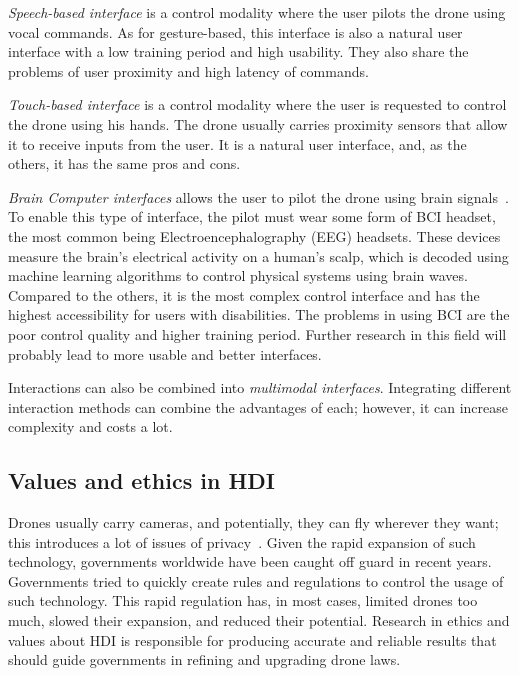 \textit{Speech-based interface} is a control modality where the user pilots the drone using vocal commands. 
As for gesture-based, this interface is also a natural user interface with a low training period and high usability.
They also share the problems of user proximity and high latency of commands.  

\textit{Touch-based interface} is a control modality where the user is requested to control the drone using his hands. 
The drone usually carries proximity sensors that allow it to receive inputs from the user. 
It is a natural user interface, and, as the others, it has the same pros and cons.

\textit{Brain Computer interfaces} allows the user to pilot the drone using brain signals~\cite{lafleur2013quadcopterBCI}.
To enable this type of interface, the pilot must wear some form of BCI headset, the most common being 
Electroencephalography (EEG) headsets. These devices measure the brain's electrical activity on a human's scalp, 
which is decoded using machine learning algorithms to control physical systems using brain waves. 
Compared to the others, it is the most complex control interface and has the highest accessibility for users with disabilities. 
The problems in using BCI are the poor control quality and higher training period. 
Further research in this field will probably lead to more usable and better interfaces.

Interactions can also be combined into \textit{multimodal interfaces}. 
Integrating different interaction methods can combine the advantages of each; however, it can increase complexity and costs a lot.

\subsection{Values and ethics in HDI}\label{subsec:hdi_ethics}
Drones usually carry cameras, and potentially, they can fly wherever they want; this introduces a lot of issues of privacy~\cite{anderson2012accidentally}.
Given the rapid expansion of such technology, governments worldwide have been caught off guard in recent years. 
Governments tried to quickly create rules and regulations to control the usage of such technology. 
This rapid regulation has, in most cases, limited drones too much, slowed their expansion, and reduced their potential.
Research in ethics and values about HDI is responsible for producing accurate and reliable results that should guide 
governments in refining and upgrading drone laws.


